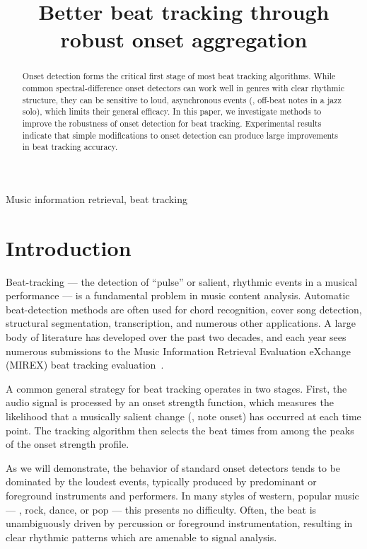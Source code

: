 \documentclass{article}
\title{Better beat tracking through robust onset aggregation}
\begin{document}
%
\maketitle
%
\begin{abstract}
Onset detection forms the critical first stage of most beat tracking algorithms.
While common spectral-difference onset detectors can work well in genres with clear 
rhythmic structure, they can be sensitive to loud, asynchronous events (\eg, off-beat 
notes in a jazz solo), which limits their general efficacy. In this paper, we investigate 
methods to improve the robustness of onset detection for beat tracking. 
Experimental results indicate that simple modifications to onset detection can produce
large improvements in beat tracking accuracy.
\end{abstract}
%
\begin{keywords}
Music information retrieval, beat tracking
\end{keywords}
%
\section{Introduction}
\label{sec:intro}
Beat-tracking --- the detection of ``pulse'' or salient, rhythmic events in a musical 
performance --- is a fundamental problem in music content analysis. Automatic 
beat-detection methods are often used for chord recognition, cover song detection, 
structural segmentation, transcription, and numerous other applications. A large body of 
literature has developed over the past two decades, and each year sees numerous 
submissions to the Music Information Retrieval Evaluation eXchange (MIREX) beat tracking 
evaluation~\cite{Downie2008}.

A common general strategy for beat tracking operates in two stages.  First, the 
audio signal is processed by an onset strength function, which measures the likelihood 
that a musically salient change (\eg, note onset) has occurred at each time point.  
The tracking algorithm then selects the beat times from among the peaks of the onset 
strength profile.

As we will demonstrate, the behavior of standard onset detectors tends to be dominated by 
the loudest events, typically produced by predominant or foreground instruments and 
performers.  In many styles of western, popular music --- \eg, rock, dance, or pop --- 
this presents no difficulty. Often, the beat is unambiguously driven by percussion or 
foreground instrumentation, resulting in clear rhythmic patterns which are amenable 
to signal analysis. 
\end{document}
